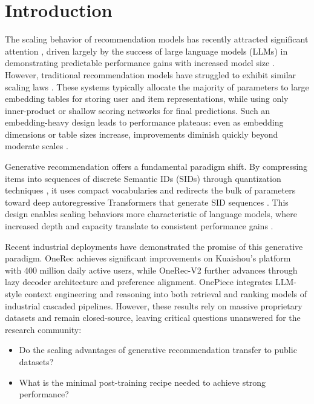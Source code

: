 \clearpage
\tableofcontents
\clearpage

\section{Introduction}
The scaling behavior of recommendation models has recently attracted significant attention \citep{OneRec, mtgr, HSTU, Wukong, URM, RankMixer, HLLM, OnePiece}, driven largely by the success of large language models (LLMs) in demonstrating predictable performance gains with increased model size \citep{GPT3, gpt4, deepseek, qwen2.5, mistral-7b, llama3, Llama2, Deepseek-r1}.
However, traditional recommendation models have struggled to exhibit similar scaling laws \citep{SASRec, GRU4Rec, Caser, SGL, survey_seq}.
These systems typically allocate the majority of parameters to large embedding tables for storing user and item representations, while using only inner-product or shallow scoring networks for final predictions.
Such an embedding-heavy design leads to performance plateaus: even as embedding dimensions or table sizes increase, improvements diminish quickly beyond moderate scales \citep{DIN, DCN, DCNv2, DeepFM}.

Generative recommendation offers a fundamental paradigm shift.
By compressing items into sequences of discrete Semantic IDs (SIDs) through quantization techniques \citep{rqkmeans, rqvae}, it uses compact vocabularies and redirects the bulk of parameters toward deep autoregressive Transformers that generate SID sequences \citep{TIGER, LCRec, TOKENRec, OneRec, OnePiece}.
This design enables scaling behaviors more characteristic of language models, where increased depth and capacity translate to consistent performance gains \citep{OneRec}.

Recent industrial deployments have demonstrated the promise of this generative paradigm.
OneRec \citep{OneRec, onerec-tech-v1} achieves significant improvements on Kuaishou's platform with 400 million daily active users, while OneRec-V2 \citep{onerec-tech-v2} further advances through lazy decoder architecture and preference alignment. 
OnePiece \citep{OnePiece} integrates LLM-style context engineering and reasoning into both retrieval and ranking models of industrial cascaded pipelines.
However, these results rely on massive proprietary datasets and remain closed-source, leaving critical questions unanswered for the research community:
\begin{itemize}
    \item Do the scaling advantages of generative recommendation transfer to public datasets?
    \item What is the minimal post-training recipe needed to achieve strong performance?
\end{itemize}



